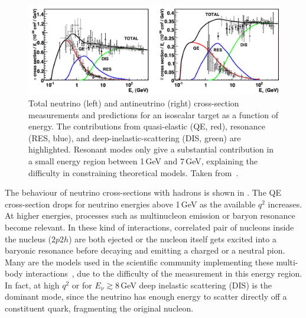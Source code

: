 \begin{figure}
	\centering
	\includegraphics[width=\textwidth]{pics/qe_xsec.pdf}
	\caption{Total neutrino (left) and antineutrino (right) cross-section measurements and predictions for an isoscalar target %
		as a function of energy. The contributions from quasi-elastic (QE, red), resonance (RES, blue), %
		and deep-inelastic-scattering (DIS, green) are highlighted.
		Resonant modes only give a substantial contribution in a small energy region between 1\,GeV and 7\,GeV, %
		explaining the difficulty in constraining theoretical models.
		Taken from~.}
	\label{fig:xsec}
\end{figure}

The behaviour of neutrino cross-sections with hadrons is shown in .
The QE cross-section drops for neutrino energies above 1\,GeV as the available $q^2$ increases. 
At higher energies, processes such as multinucleon emission or baryon resonance become relevant.
In these kind of interactions, correlated pair of nucleons inside the nucleus ($2p2h$) are both ejected or %
the nucleon itself gets excited into a baryonic resonance before decaying and emitting a charged or a neutral pion.
Many are the models used in the scientific community implementing these multi-body %
interactions~\cite{Rein:1980wg, Martini:2009uj, Nieves:2011pp}, %
due to the difficulty of the measurement in this energy region.
In fact, at high $q^2$ or for $E_\nu \gtrsim 8$\,GeV deep inelastic scattering (DIS) is the dominant mode, since %
the neutrino has enough energy to scatter directly off a constituent quark, fragmenting the original nucleon.
